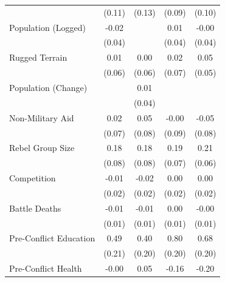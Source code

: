 \documentclass[12pt, letterpaper]{article}
\begin{document}
\begin{table}[htbp]
\begin{small}
\begin{tabular}{l*{4}{c}}
                    &      (0.11)         &      (0.13)         &      (0.09)         &      (0.10)         \\
Population (Logged) &       -0.02         &                     &        0.01         &       -0.00         \\
                    &      (0.04)         &                     &      (0.04)         &      (0.04)         \\
Rugged Terrain      &        0.01         &        0.00         &        0.02         &        0.05         \\
                    &      (0.06)         &      (0.06)         &      (0.07)         &      (0.05)         \\
Population (Change) &                     &        0.01         &                     &                     \\
                    &                     &      (0.04)         &                     &                     \\
Non-Military Aid    &        0.02         &        0.05         &       -0.00         &       -0.05         \\
                    &      (0.07)         &      (0.08)         &      (0.09)         &      (0.08)         \\
Rebel Group Size    &        0.18\sym{**} &        0.18\sym{**} &        0.19\sym{**} &        0.21\sym{***}\\
                    &      (0.08)         &      (0.08)         &      (0.07)         &      (0.06)         \\
Competition         &       -0.01         &       -0.02         &        0.00         &        0.00         \\
                    &      (0.02)         &      (0.02)         &      (0.02)         &      (0.02)         \\
Battle Deaths       &       -0.01         &       -0.01         &        0.00         &       -0.00         \\
                    &      (0.01)         &      (0.01)         &      (0.01)         &      (0.01)         \\
Pre-Conflict Education&        0.49\sym{**} &        0.40\sym{*}  &        0.80\sym{***}&        0.68\sym{***}\\
                    &      (0.21)         &      (0.20)         &      (0.20)         &      (0.20)         \\
Pre-Conflict Health &       -0.00         &        0.05         &       -0.16         &       -0.20         \\

\end{tabular}
\end{small}
\end{table}
\end{document}

